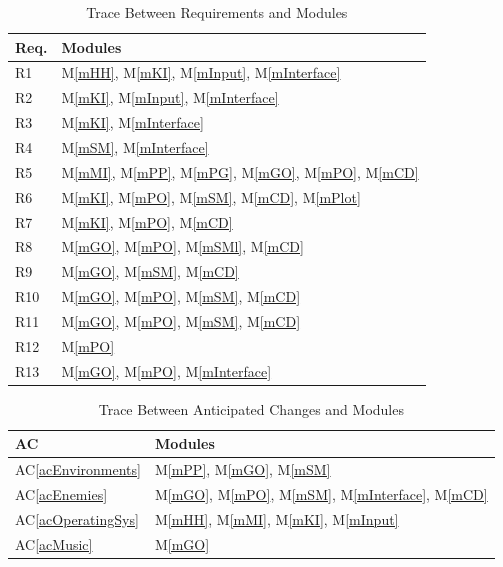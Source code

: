 \documentclass[12pt, titlepage]{article}
\newcommand{\acref}[1]{AC\ref{#1}}
\newcommand{\mref}[1]{M\ref{#1}}
\begin{document}
\begin{table}[H]
\centering
\begin{tabular}{p{} p{}}
\toprule
\textbf{Req.} & \textbf{Modules}\\
\midrule
R1 & \mref{mHH}, \mref{mKI}, \mref{mInput}, \mref{mInterface}\\
R2 & \mref{mKI}, \mref{mInput}, \mref{mInterface}\\
R3 & \mref{mKI}, \mref{mInterface}\\
R4 & \mref{mSM}, \mref{mInterface}\\
R5 & \mref{mMI}, \mref{mPP}, \mref{mPG}, \mref{mGO}, \mref{mPO}, \mref{mCD}\\
R6 & \mref{mKI}, \mref{mPO}, \mref{mSM}, \mref{mCD}, \mref{mPlot}\\
R7 & \mref{mKI}, \mref{mPO}, \mref{mCD}\\
R8 & \mref{mGO}, \mref{mPO}, \mref{mSMl}, \mref{mCD}\\
R9 & \mref{mGO}, \mref{mSM}, \mref{mCD}\\
R10 & \mref{mGO}, \mref{mPO}, \mref{mSM}, \mref{mCD}\\
R11 & \mref{mGO}, \mref{mPO}, \mref{mSM}, \mref{mCD}\\
R12 & \mref{mPO}\\
R13 & \mref{mGO}, \mref{mPO}, \mref{mInterface}\\
\bottomrule
\end{tabular}
\caption{Trace Between Requirements and Modules}
\label{TblRT}
\end{table}

\begin{table}[H]
\centering
\begin{tabular}{p{} p{}}
\toprule
\textbf{AC} & \textbf{Modules}\\
\midrule
\acref{acEnvironments} & \mref{mPP}, \mref{mGO}, \mref{mSM}\\
\acref{acEnemies} & \mref{mGO}, \mref{mPO}, \mref{mSM}, \mref{mInterface}, \mref{mCD}\\
\acref{acOperatingSys} & \mref{mHH}, \mref{mMI}, \mref{mKI}, \mref{mInput}\\
\acref{acMusic} & \mref{mGO}\\
\bottomrule
\end{tabular}
\caption{Trace Between Anticipated Changes and Modules}
\label{TblACT}
\end{table}
\end{document}
